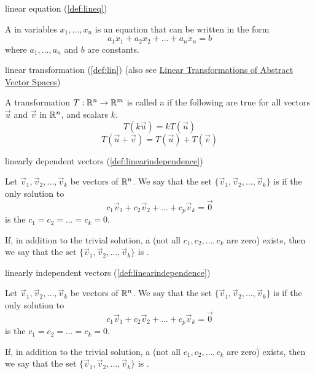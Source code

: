 \documentclass{ximera}
\begin{document}

linear equation (\ref{def:lineq})
\begin{expandable}{}{}
    A  in variables $x_1, \ldots, x_n$ is an equation that can be written in the form
$$a_1x_1+a_2x_2+\ldots +a_nx_n=b$$
where $a_1,\ldots ,a_n$ and $b$ are constants.
\end{expandable}

linear transformation (\ref{def:lin}) (also see \href{https://ximera.osu.edu/linearalgebradzv3/LinearAlgebraInteractiveIntro/LTR-0022/main}{Linear Transformations of Abstract Vector Spaces})
\begin{expandable}{}{}
    A transformation $T:\mathbb{R}^n\rightarrow \mathbb{R}^m$ is called a  if the following are true for all vectors $\vec{u}$ and $\vec{v}$ in $\mathbb{R}^n$, and scalars $k$.
\begin{equation}
T(k\vec{u})= kT(\vec{u})
\end{equation}
\begin{equation}
T(\vec{u}+\vec{v})= T(\vec{u})+T(\vec{v})
\end{equation}
\end{expandable}

linearly dependent vectors (\ref{def:linearindependence})
\begin{expandable}{}{}
    Let $\vec{v}_1, \vec{v}_2,\ldots ,\vec{v}_k$ be vectors of $\mathbb{R}^n$.  We say that the set $\{\vec{v}_1, \vec{v}_2,\ldots ,\vec{v}_k\}$ is  if the only solution to 
\begin{equation}c_1\vec{v}_1+c_2\vec{v}_2+\ldots +c_p\vec{v}_k=\vec{0}\end{equation}
is the  $c_1=c_2=\ldots =c_k=0$.

If, in addition to the trivial solution, a  (not all $c_1, c_2,\ldots ,c_k$ are zero) exists, then we say that the set $\{\vec{v}_1, \vec{v}_2,\ldots ,\vec{v}_k\}$ is .
\end{expandable}

linearly independent vectors (\ref{def:linearindependence})
\begin{expandable}{}{}
    Let $\vec{v}_1, \vec{v}_2,\ldots ,\vec{v}_k$ be vectors of $\mathbb{R}^n$.  We say that the set $\{\vec{v}_1, \vec{v}_2,\ldots ,\vec{v}_k\}$ is  if the only solution to 
\begin{equation}c_1\vec{v}_1+c_2\vec{v}_2+\ldots +c_p\vec{v}_k=\vec{0}\end{equation}
is the  $c_1=c_2=\ldots =c_k=0$.

If, in addition to the trivial solution, a  (not all $c_1, c_2,\ldots ,c_k$ are zero) exists, then we say that the set $\{\vec{v}_1, \vec{v}_2,\ldots ,\vec{v}_k\}$ is .
\end{expandable}
\end{document}
